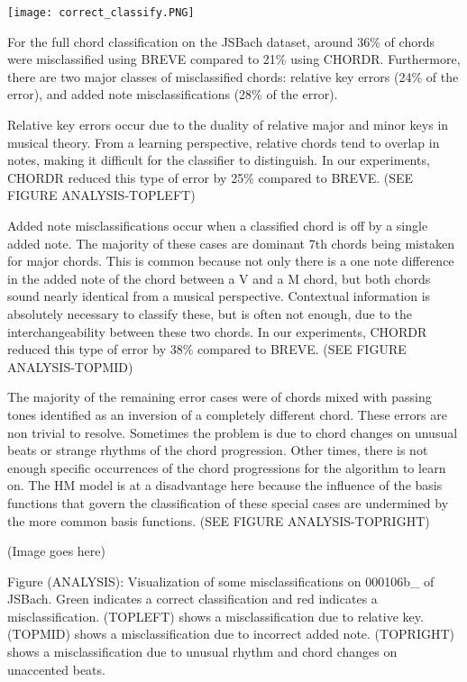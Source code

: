 \documentclass{article} %
\begin{document}
\texttt{[image: correct\_classify.PNG]}

For the full chord classification on the JSBach dataset, around 36\% of chords were misclassified using BREVE compared to 21\% using CHORDR. Furthermore, there are two major classes of misclassified chords: relative key errors (24\% of the error), and added note misclassifications (28\% of the error).

Relative key errors occur due to the duality of relative major and minor keys in musical theory. From a learning perspective, relative chords tend to overlap in notes, making it difficult for the classifier to distinguish. In our experiments, CHORDR reduced this type of error by 25\% compared to BREVE. (SEE FIGURE ANALYSIS-TOPLEFT)

Added note misclassifications occur when a classified chord is off by a single added note. The majority of these cases are dominant 7th chords being mistaken for major chords. This is common because not only there is a one note difference in the added note of the chord between a V and a M chord, but both chords sound nearly identical from a musical perspective. Contextual information is absolutely necessary to classify these, but is often not enough, due to the interchangeability between these two chords. In our experiments, CHORDR reduced this type of error by 38\% compared to BREVE. (SEE FIGURE ANALYSIS-TOPMID)

The majority of the remaining error cases were of chords mixed with passing tones identified as an inversion of a completely different chord. These errors are non trivial to resolve. Sometimes the problem is due to chord changes on unusual beats or strange rhythms of the chord progression. Other times, there is not enough specific occurrences of the chord progressions for the algorithm to learn on. The HM model is at a disadvantage here because the influence of the basis functions that govern the classification of these special cases are undermined by the more common basis functions. (SEE FIGURE ANALYSIS-TOPRIGHT)

(Image goes here)

Figure (ANALYSIS): Visualization of some misclassifications on 000106b\_ of JSBach. Green indicates a correct classification and red indicates a misclassification. (TOPLEFT) shows a misclassification due to relative key. (TOPMID) shows a misclassification due to incorrect added note. (TOPRIGHT) shows a misclassification due to unusual rhythm and chord changes on unaccented beats.
\end{document}
